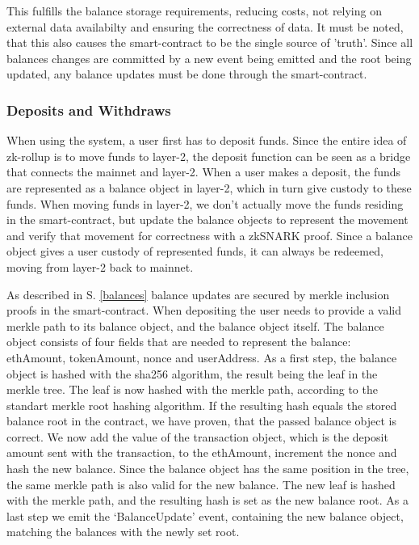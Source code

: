 \documentclass[../../thesis.tex]{subfiles}
\begin{document}
This fulfills the balance storage requirements, reducing costs, not relying on external data availabilty and ensuring the correctness of data. It must be noted, that this also causes the smart-contract to be the single source of 'truth'. Since all balances changes are committed by a new event being emitted and the root being updated, any balance updates must be done through the smart-contract.

\subsubsection{Deposits and Withdraws} \label{dep_with}
When using the system, a user first has to deposit funds. Since the entire idea of zk-rollup is to move funds to layer-2, the deposit function can be seen as a bridge that connects the mainnet and layer-2. When a user makes a deposit, the funds are represented as a balance object in layer-2, which in turn give custody to these funds. When moving funds in layer-2, we don't actually move the funds residing in the smart-contract, but update the balance objects to represent the movement and verify that movement for correctness with a zkSNARK proof. Since a balance object gives a user custody of represented funds, it can always be redeemed, moving from layer-2 back to mainnet.  

As described in S. \ref{balances} balance updates are secured by merkle inclusion proofs in the smart-contract. When depositing the user needs to provide a valid merkle path to its balance object, and the balance object itself. The balance object consists of four fields that are needed to represent the balance: ethAmount, tokenAmount, nonce and userAddress. As a first step, the balance object is hashed with the sha256 algorithm, the result being the leaf in the merkle tree. The leaf is now hashed with the merkle path, according to the standart merkle root hashing algorithm. If the resulting hash equals the stored balance root in the contract, we have proven, that the passed balance object is correct. We now add the value of the transaction object, which is the deposit amount sent with the transaction, to the ethAmount, increment the nonce and hash the new balance. Since the balance object has the same position in the tree, the same merkle path is also valid for the new balance. The new leaf is hashed with the merkle path, and the resulting hash is set as the new balance root. As a last step we emit the `BalanceUpdate' event, containing the new balance object, matching the balances with the newly set root. 
\end{document}
